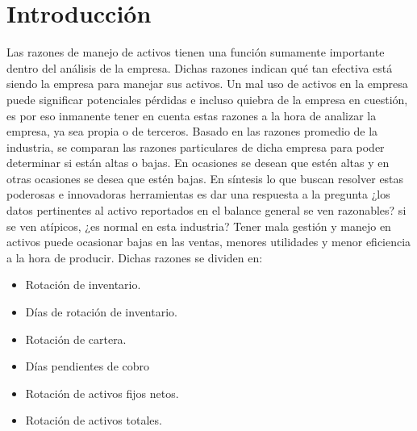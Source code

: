 \documentclass{article}
\begin{document}


\section{Introducción}
{
    Las razones de manejo de activos tienen una función sumamente importante dentro del análisis de la empresa. Dichas razones indican qué tan efectiva está siendo la empresa para manejar sus activos. Un mal uso de activos en la empresa puede significar potenciales pérdidas e incluso quiebra de la empresa en cuestión, es por eso inmanente tener en cuenta estas razones a la hora de analizar la empresa, ya sea propia o de terceros. Basado en las razones promedio de la industria, se comparan las razones particulares de dicha empresa para poder determinar si están altas o bajas. En ocasiones se desean que estén altas y en otras ocasiones se desea que estén bajas. En síntesis lo que buscan resolver estas poderosas e innovadoras herramientas es dar una respuesta a la pregunta ¿los datos pertinentes al activo reportados en el balance general se ven razonables? si se ven atípicos, ¿es normal en esta industria? Tener mala gestión y manejo en activos puede ocasionar bajas en las ventas, menores utilidades y menor eficiencia a la hora de producir. Dichas razones se dividen en:
    \begin{itemize}
        \item Rotación de inventario.
        \item Días de rotación de inventario.
        \item Rotación de cartera.
        \item Días pendientes de cobro
        \item Rotación de activos fijos netos.
        \item Rotación de activos totales.
    \end{itemize}
}
\end{document}
